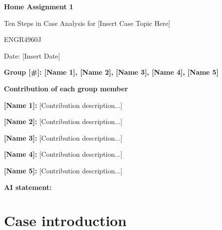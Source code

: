 \documentclass[12pt,a4paper]{article}
\begin{document}
\begin{titlepage}
    \centering
    \vspace*{1.5cm}
    {\Huge \textbf{Home Assignment 1}\par}
    \vspace{1.5cm}
    {\Large Ten Steps in Case Analysis for [Insert Case Topic Here]\par}
    \vspace{2cm}
    {\large ENGR4960J\par}
    \vspace{0.5cm}
    {\large Date: [Insert Date]\par}

    \vfill

    {\textbf{Group [\#]: [Name 1], [Name 2], [Name 3], [Name 4], [Name 5]}\par}
    \vspace{0.5cm}

    {\textbf{Contribution of each group member}\par}
    \begin{flushleft}
    \textbf{[Name 1]:} [Contribution description...]\par
    \textbf{[Name 2]:} [Contribution description...]\par
    \textbf{[Name 3]:} [Contribution description...]\par
    \textbf{[Name 4]:} [Contribution description...]\par
    \textbf{[Name 5]:} [Contribution description...]\par
    \end{flushleft}

    \vspace{0.5cm}

    {\textbf{AI statement:}\par}
    \begin{flushleft}
    \end{flushleft}

    \vspace{1cm}
\end{titlepage}

\tableofcontents
\newpage

\section*{Case introduction}
\end{document}
